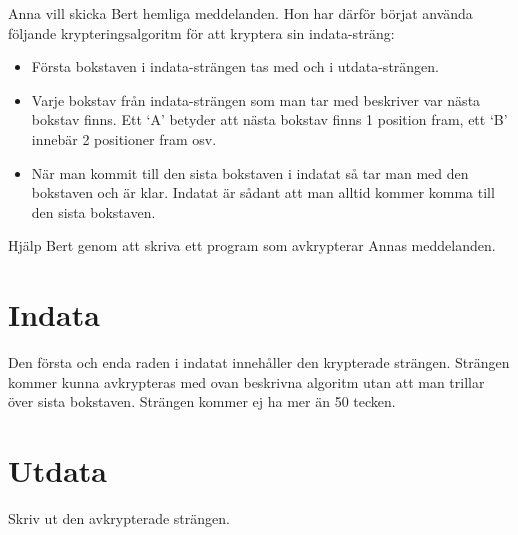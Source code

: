 
Anna vill skicka Bert hemliga meddelanden.  Hon har därför börjat använda
följande krypteringsalgoritm för att kryptera sin indata-sträng:

\begin{itemize}
  \item Första bokstaven i indata-strängen tas med och i utdata-strängen.
  \item Varje bokstav från indata-strängen som man tar med beskriver var nästa
    bokstav finns. Ett `A' betyder att nästa bokstav finns 1 position fram, ett
    `B' innebär 2 positioner fram osv.
  \item När man kommit till den sista bokstaven i indatat så tar man med den
    bokstaven och är klar. Indatat är sådant att man alltid kommer komma till
    den sista bokstaven.
\end{itemize}

Hjälp Bert genom att skriva ett program som avkrypterar Annas meddelanden.

\section*{Indata}

Den första och enda raden i indatat innehåller den krypterade strängen. Strängen
kommer kunna avkrypteras med ovan beskrivna algoritm utan att man trillar över
sista bokstaven. Strängen kommer ej ha mer än 50 tecken.

\section*{Utdata}

Skriv ut den avkrypterade strängen.
